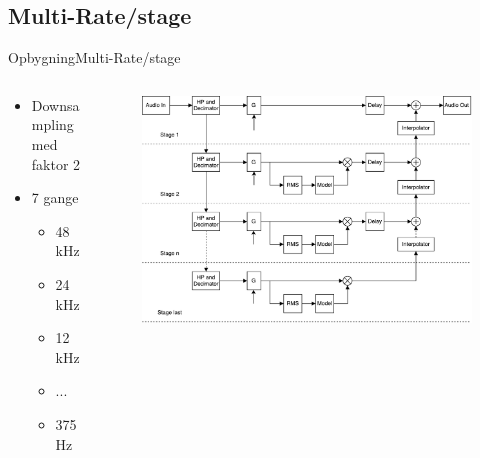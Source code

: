 
\subsection{Multi-Rate/stage}
\begin{frame}{Opbygning}{Multi-Rate/stage}
\begin{columns}
  \begin{column}{0.25\textwidth}
\begin{itemize}
\item Downsampling med faktor 2
\item 7 gange
\begin{itemize}
\item 48 kHz
\item 24 kHz
\item 12 kHz
\item ...
\item 375 Hz
\end{itemize}
\end{itemize}
  \end{column}
  \begin{column}{0.75\textwidth}
\begin{figure}
\includegraphics[width=\textwidth]{designRealBlock1}
\end{figure}
  \end{column}
\end{columns}
\end{frame}

